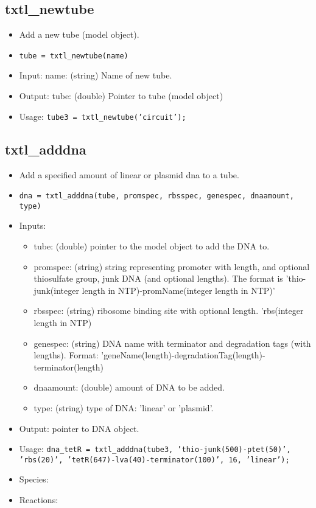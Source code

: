 \documentclass[english]{report}
\begin{document}
		\subsection*{txtl\_newtube}		
			\begin{itemize}
			\item Add a new tube (model object).
			\item \texttt{tube = txtl\_newtube(name)}
			\item Input: name: (string) Name of new tube. 
			\item Output: tube: (double) Pointer to tube (model object)
			\item Usage: \texttt{tube3 = txtl\_newtube('circuit');} 
			\end{itemize}					
		\subsection*{txtl\_adddna}
			\begin{itemize}
			\item Add a specified amount of linear or plasmid dna to a tube.
			\item \texttt{dna = txtl\_adddna(tube, promspec, rbsspec, genespec, dnaamount, type)}
			\item Inputs: 
				\begin{itemize}
				\item tube: (double) pointer to the model object to add the DNA to.
				\item promspec: (string) string representing promoter with length, and optional thiosulfate group, junk DNA (and optional lengths). The format is 'thio-junk(integer length in NTP)-promName(integer length in NTP)'
				\item rbsspec: (string) ribosome binding site with optional length. 'rbs(integer length in NTP)
				\item genespec: (string) DNA name with terminator and degradation tags (with lengths). Format: 'geneName(length)-degradationTag(length)-terminator(length)
				\item dnaamount: (double) amount of DNA to be added.
				\item type: (string) type of DNA: 'linear' or 'plasmid'.
				\end{itemize}
				\item Output: pointer to DNA object.
			\item Usage: \texttt{dna\_tetR = txtl\_adddna(tube3, 'thio-junk(500)-ptet(50)', 'rbs(20)', 'tetR(647)-lva(40)-terminator(100)', 16, 'linear');}
			\item Species:
			\item Reactions:
			\end{itemize}		
\end{document}
